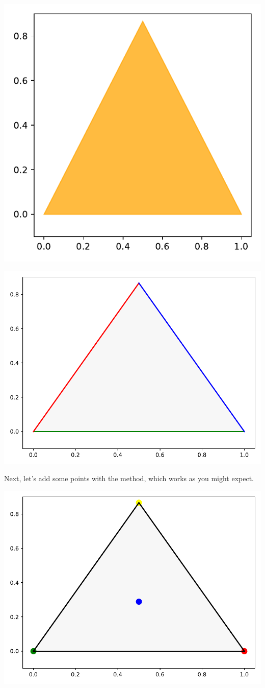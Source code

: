 
\begin{center}
    \includegraphics[width = .5\textwidth]{figures/specialplots/basic-ternary.pdf}
\end{center}


\begin{center}
    \includegraphics[width = .6\textwidth]{figures/specialplots/color-ternary.pdf}
\end{center}


Next, let's add some points with the  method, which works as you might expect. 


\begin{center}
    \includegraphics[width = .6\textwidth]{figures/specialplots/scatter-ternary.pdf}
\end{center}

